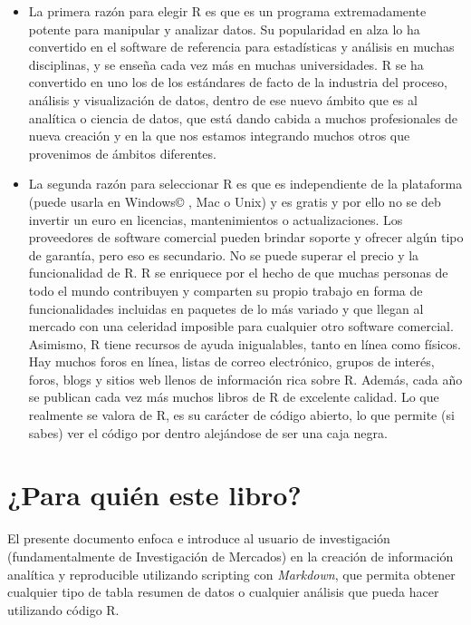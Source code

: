 \documentclass[
]{book}
\begin{document}
\begin{itemize}
\item
  La primera razón para elegir R es que es un programa extremadamente potente para manipular y analizar datos. Su popularidad en alza lo ha convertido en el software de referencia para estadísticas y análisis en muchas disciplinas, y se enseña cada vez más en muchas universidades. R se ha convertido en uno los de los estándares de facto de la industria del proceso, análisis y visualización de datos, dentro de ese nuevo ámbito que es al analítica o ciencia de datos, que está dando cabida a muchos profesionales de nueva creación y en la que nos estamos integrando muchos otros que provenimos de ámbitos diferentes.
\item
  La segunda razón para seleccionar R es que es independiente de la plataforma (puede usarla en Windows© , Mac o Unix) y es gratis y por ello no se deb invertir un euro en licencias, mantenimientos o actualizaciones. Los proveedores de software comercial pueden brindar soporte y ofrecer algún tipo de garantía, pero eso es secundario. No se puede superar el precio y la funcionalidad de R. R se enriquece por el hecho de que muchas personas de todo el mundo contribuyen y comparten su propio trabajo en forma de funcionalidades incluidas en paquetes de lo más variado y que llegan al mercado con una celeridad imposible para cualquier otro software comercial. Asimismo, R tiene recursos de ayuda inigualables, tanto en línea como físicos. Hay muchos foros en línea, listas de correo electrónico, grupos de interés, foros, blogs y sitios web llenos de información rica sobre R. Además, cada año se publican cada vez más muchos libros de R de excelente calidad. Lo que realmente se valora de R, es su carácter de código abierto, lo que permite (si sabes) ver el código por dentro alejándose de ser una caja negra.
\end{itemize}

\hypertarget{para-quiuxe9n-este-libro}{%
\section{¿Para quién este libro?}\label{para-quiuxe9n-este-libro}}

El presente documento enfoca e introduce al usuario de investigación (fundamentalmente de Investigación de Mercados) en la creación de información analítica y reproducible utilizando scripting con \emph{Markdown}, que permita obtener cualquier tipo de tabla resumen de datos o cualquier análisis que pueda hacer utilizando código R.
\end{document}

